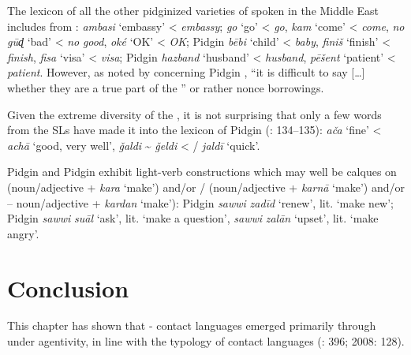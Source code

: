 \documentclass[output=paper]{langsci/langscibook}
\begin{document}
  The lexicon of all the other pidginized varieties of  spoken in the Middle East includes  from :  \textit{ambasi} `embassy' <  \textit{embassy}; \textit{go} `go' <  \textit{go}, \textit{kam} `come' <  \textit{come}, \textit{no} \textit{gūɖ} ‘bad’ <  \textit{no} \textit{good}, \textit{oké} `OK' <  \textit{OK};  Pidgin  \textit{bēbi} ‘child’ <  \textit{baby}, \textit{finiš} ‘finish’ <  \textit{finish}, \textit{fisa} ‘visa’ <  \textit{visa};  Pidgin  \textit{hazband} `husband' <  \textit{husband}, \textit{pēšent} ‘patient’ <  \textit{patient}. However, as noted by \citet[113]{Smart1990} concerning  Pidgin , “it is difficult to say […] whether they are a true part of the ” or rather nonce borrowings.  

Given the extreme diversity of the , it is not surprising that only a few words from the SLs have made it into the lexicon of  Pidgin  (\citealt{Avram2017article}: 134–135): \textit{ača} ‘fine’ <  \textit{achā} ‘good, very well’, \textit{ǧaldi} {\textasciitilde}  \textit{ǧeldi} < / \textit{jaldī} ‘quick’. 

 Pidgin  and  Pidgin  exhibit light-verb constructions which may well be calques on  (noun/adjective + \textit{kara} ‘make’) and/or / (noun/adjective + \textit{karnā} ‘make’) and/or  – noun/adjective + \textit{kardan} ‘make’):  Pidgin  \textit{sawwi} \textit{zadīd} ‘renew’, lit. ‘make new’;  Pidgin  \textit{sawwi} \textit{suāl} ‘ask’, lit. ‘make a question’, \textit{sawwi} \textit{zalān} ‘upset’, lit. ‘make angry’. 

\section{Conclusion}\label{sec:conc}

This chapter has shown that - contact languages emerged primarily through  under  agentivity, in line with the typology of contact languages (\citealt{Winford2005}: 396; 2008: 128). 
\end{document}
